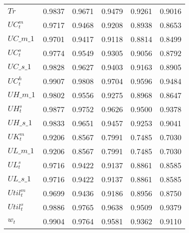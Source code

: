 \begin{center}
\begin{longtable}{lccccc}
$ Tr                        $	 & 	        0.9837	 & 	        0.9671	 & 	        0.9479	 & 	        0.9261	 & 	        0.9016 \\ 
$ UC^m_t                    $	 & 	        0.9717	 & 	        0.9468	 & 	        0.9208	 & 	        0.8938	 & 	        0.8653 \\ 
$UC\_m\_1                   $	 & 	        0.9701	 & 	        0.9417	 & 	        0.9118	 & 	        0.8814	 & 	        0.8499 \\ 
$ UC^s_t                    $	 & 	        0.9774	 & 	        0.9549	 & 	        0.9305	 & 	        0.9056	 & 	        0.8792 \\ 
$UC\_s\_1                   $	 & 	        0.9828	 & 	        0.9627	 & 	        0.9403	 & 	        0.9163	 & 	        0.8905 \\ 
$ UC^h_t                    $	 & 	        0.9907	 & 	        0.9808	 & 	        0.9704	 & 	        0.9596	 & 	        0.9484 \\ 
$UH\_m\_1                   $	 & 	        0.9802	 & 	        0.9556	 & 	        0.9275	 & 	        0.8968	 & 	        0.8647 \\ 
$  UH^s_t                   $	 & 	        0.9877	 & 	        0.9752	 & 	        0.9626	 & 	        0.9500	 & 	        0.9378 \\ 
$UH\_s\_1                   $	 & 	        0.9833	 & 	        0.9651	 & 	        0.9457	 & 	        0.9253	 & 	        0.9041 \\ 
$  UK^m_t                   $	 & 	        0.9206	 & 	        0.8567	 & 	        0.7991	 & 	        0.7485	 & 	        0.7030 \\ 
$UL\_m\_1                   $	 & 	        0.9206	 & 	        0.8567	 & 	        0.7991	 & 	        0.7485	 & 	        0.7030 \\ 
$  UL^s_t                   $	 & 	        0.9716	 & 	        0.9422	 & 	        0.9137	 & 	        0.8861	 & 	        0.8585 \\ 
$UL\_s\_1                   $	 & 	        0.9716	 & 	        0.9422	 & 	        0.9137	 & 	        0.8861	 & 	        0.8585 \\ 
$ Util^m_t                  $	 & 	        0.9699	 & 	        0.9436	 & 	        0.9186	 & 	        0.8956	 & 	        0.8750 \\ 
$  Util^s_t                 $	 & 	        0.9886	 & 	        0.9765	 & 	        0.9638	 & 	        0.9509	 & 	        0.9379 \\ 
$ w_t                       $	 & 	        0.9904	 & 	        0.9764	 & 	        0.9581	 & 	        0.9362	 & 	        0.9110 \\ 

\end{longtable}
\end{center}
